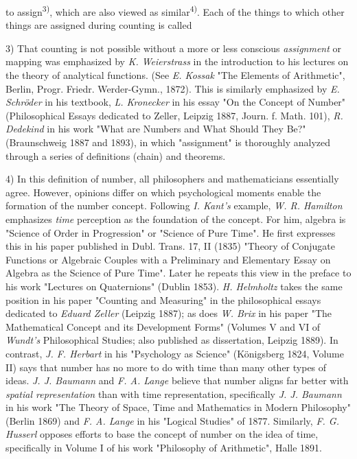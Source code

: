 \thispagestyle{fancy}

\vspace{0.5cm}

to assign\textsuperscript{3)}, which are also viewed as similar\textsuperscript{4)}. Each of the things to which other  \hfill things \hfill are  \hfill assigned  \hfill during  \hfill counting  \hfill is  \hfill called

\vspace{-0.1cm}
\leftline{\rule{2in}{0.4pt}}
\vspace{0.1cm}
{
\footnotesize

3) That counting is not possible without a more or less conscious \textit{assignment} or mapping was emphasized by \textit{K. Weierstrass} in the introduction to his lectures on the theory of analytical functions. (See \textit{E. Kossak} "The Elements of Arithmetic", Berlin, Progr. Friedr. Werder-Gymn., 1872). This is similarly emphasized by \textit{E. Schröder} in his textbook, \textit{L. Kronecker} in his essay "On the Concept of Number" (Philosophical Essays dedicated to Zeller, Leipzig 1887, Journ. f. Math. 101), \textit{R. Dedekind} in his work "What are Numbers and What Should They Be?" (Braunschweig 1887 and 1893), in which "assignment" is thoroughly analyzed through a series of definitions (chain) and theorems.

4) In this definition of number, all philosophers and mathematicians essentially agree. However, opinions differ on which psychological moments enable the formation of the number concept. Following \textit{I. Kant's} example, \textit{W. R. Hamilton} emphasizes \textit{time} perception as the foundation of the concept. For him, algebra is "Science of Order in Progression" or "Science of Pure Time". He first expresses this in his paper published in Dubl. Trans. 17, II (1835) "Theory of Conjugate Functions or Algebraic Couples with a Preliminary and Elementary Essay on Algebra as the Science of Pure Time". Later he repeats this view in the preface to his work "Lectures on Quaternions" (Dublin 1853). \textit{H. Helmholtz} takes the same position in his paper "Counting and Measuring" in the philosophical essays dedicated to \textit{Eduard Zeller} (Leipzig 1887); as does \textit{W. Brix} in his paper "The Mathematical Concept and its Development Forms" (Volumes V and VI of \textit{Wundt's} Philosophical Studies; also published as dissertation, Leipzig 1889). In contrast, \textit{J. F. Herbart} in his "Psychology as Science" (Königsberg 1824, Volume II) says that number has no more to do with time than many other types of ideas. \textit{J. J. Baumann} and \textit{F. A. Lange} believe that number aligns far better with \textit{spatial representation} than with time representation, specifically \textit{J. J. Baumann} in his work "The Theory of Space, Time and Mathematics in Modern Philosophy" (Berlin 1869) and \textit{F. A. Lange} in his "Logical Studies" of 1877. Similarly, \textit{F. G. Husserl} opposes efforts to base the concept of number on the idea of time, specifically in Volume I of his work "Philosophy of Arithmetic", Halle 1891.

}
